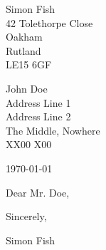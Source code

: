 \documentclass{article}
\def \recipname {John Doe}
\def \recipgreeting {Dear Mr. Doe}
\def \recipaddresslineone {Address Line 1}
\def \recipaddresslinetwo {Address Line 2}
\def \reciptown {The Middle}
\def \recipcounty {Nowhere}
\def \recippostcode {XX00 X00}
\begin{document}
\setlength{\parindent}{0em}
\begin{flushright}
	Simon Fish\\
	42 Tolethorpe Close\\
	Oakham\\
	Rutland\\
	LE15 6GF\\
\end{flushright}

\recipname\\\recipaddresslineone\\\recipaddresslinetwo\\\reciptown, \recipcounty\\\recippostcode

\bigskip

\today
\bigskip

\recipgreeting,
\setlength{\parindent}{2em}
\bigskip


\bigskip

Sincerely,

\vspace{4\baselineskip}

Simon Fish
\end{document}
